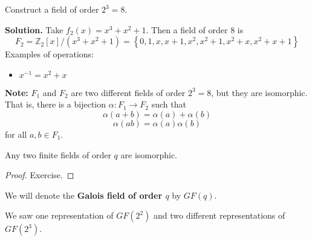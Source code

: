 \begin{exbox}
    \begin{example}
        Construct a field of order $ 2^3=8 $.

        \textbf{Solution.} Take $ f_2(x)=x^3+x^2+1 $. Then a field of order $ 8 $ is
        \[ F_2=\mathbb{Z}_2[x]/(x^3+x^2+1)=\left\{ 0,1,x,x+1,x^2,x^2+1,x^2+x,x^2+x+1\right\} \]
        Examples of operations:
        \begin{itemize}
            \item $ x^{-1}=x^2+x $
        \end{itemize}
    \end{example}
\end{exbox}

\textbf{Note:} $ F_1 $ and $ F_2 $ are two different fields of order $ 2^3=8 $,
but they are isomorphic. That is,
there is a bijection $ \alpha : F_1\rightarrow F_2 $ such that
\[ \alpha(a+b)=\alpha(a)+\alpha(b) \]
\[ \alpha(ab)=\alpha(a)\alpha(b) \]
for all $ a,b\in F_1 $.

\begin{thmbox}
    \begin{theorem}
        Any two finite fields of order $ q $ are isomorphic.
    \end{theorem}
\end{thmbox}

\begin{proof}
    Exercise.
\end{proof}

\begin{defbox}
    \begin{definition}
        We will denote the \textbf{Galois field of order $ q $} by $ GF(q) $.
    \end{definition}
\end{defbox}
We saw one representation of $ GF(2^2) $
and two different representations of $ GF(2^3) $.
